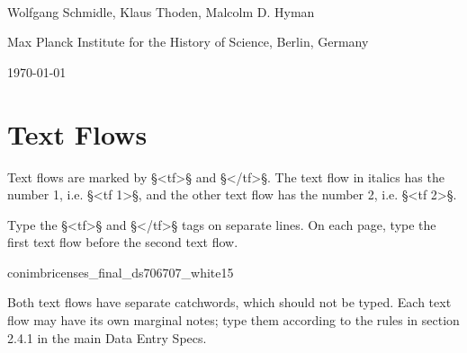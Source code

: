 \documentclass[fontsize=11pt, paper=a4, 
DIV15,
normalheadings,
parskip=half-, 
pointlessnumbers]{scrartcl}
\begin{document}
\begin{center}
{} \\[5mm]
\large Wolfgang Schmidle, Klaus Thoden, Malcolm D. Hyman

\normalsize Max Planck Institute for the History of Science, Berlin, Germany

\today
\end{center}

\section{Text Flows}

\begin{mainrule}
Text flows are marked by §<tf>§ and §</tf>§. The text flow in italics has the number 1, i.e. §<tf 1>§, and the other text flow has the number 2, i.e. §<tf 2>§.
\end{mainrule}

\begin{clarification}
Type the §<tf>§ and §</tf>§ tags on separate lines. On each page, type the first text flow before the second text flow.
\end{clarification}

\vspace{3mm}
\begin{sampleImage}{conimbricenses_final_ds706707_white15}

\notTranscribed
\end{sampleImage}

\begin{note}
Both text flows have separate catchwords, which should not be typed. Each text flow may have its own marginal notes; type them according to the rules in section 2.4.1 in the main Data Entry Specs. 
\end{note}

\end{document}
